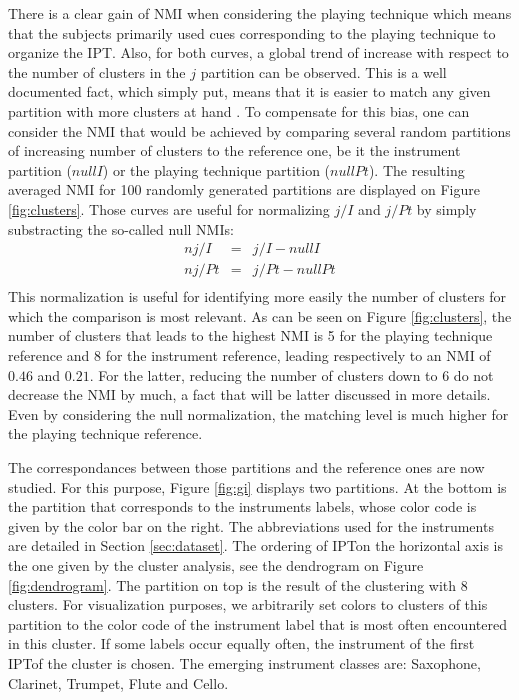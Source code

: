 \documentclass{article}
\newcommand{\ipt}{IPT}
\begin{document}
There is a clear gain of NMI when considering the playing technique which means that the subjects primarily used cues corresponding to the playing technique to organize the \ipt. Also, for both curves, a global trend of increase with respect to the number of clusters in the $j$ partition can be observed. This is a well documented fact, which simply put, means that it is easier to match any given partition with more clusters at hand \cite{tibshirani2001estimating}. To compensate for this bias, one can consider the NMI that would be achieved by comparing several random partitions of increasing number of clusters to the reference one, be it the instrument partition ($nullI$) or the playing technique partition ($nullPt$). The resulting averaged NMI for 100 randomly generated partitions are displayed on Figure \ref{fig:clusters}. Those curves are useful for normalizing $j/I$ and $j/Pt$ by simply substracting the so-called null NMIs:
\begin{eqnarray}
  nj/I &=& j/I - nullI  \\
  nj/Pt &=& j/Pt - nullPt  \\
\end{eqnarray}
This normalization is useful for identifying more easily the number of clusters for which the comparison is most relevant. As can be seen on Figure \ref{fig:clusters}, the number of clusters that leads to the highest NMI is 5 for the playing technique reference and 8 for the instrument reference, leading respectively to an NMI of $0.46$ and $0.21$. For the latter, reducing the number of clusters down to 6 do not decrease the NMI by much, a fact that will be latter discussed in more details. Even by considering the null normalization, the matching level is much higher for the playing technique reference.

The correspondances between those partitions and the reference ones are now studied. For this purpose, Figure \ref{fig:gi} displays two partitions. At the bottom is the partition that corresponds to the instruments labels, whose color code is given by the color bar on the right. The abbreviations used for the instruments are detailed in Section \ref{sec:dataset}. The ordering of \ipt on the horizontal axis is the one given by the cluster analysis, see the dendrogram on Figure \ref{fig:dendrogram}. The partition on top is the result of the clustering with 8 clusters. For visualization purposes, we arbitrarily set colors to clusters of this partition to the color code of the instrument label that is most often encountered in this cluster. If some labels occur equally often, the instrument of the first \ipt of the cluster is chosen. The emerging instrument classes are: Saxophone, Clarinet, Trumpet, Flute and Cello.
\end{document}
